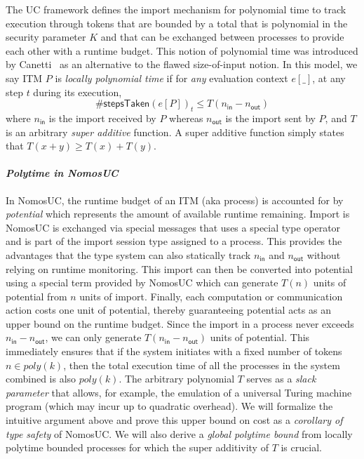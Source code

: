 The UC framework defines the import mechanism for polynomial time to track execution through tokens that
are bounded by a total that is polynomial in the security parameter $K$ and that can be exchanged between processes to provide each other with a runtime budget.
This notion of polynomial time was introduced by Canetti~\cite{canettiUC} as an alternative to the flawed size-of-input notion. 
In this model, we say ITM $P$ is \emph{locally polynomial time} if for \emph{any} evaluation context $e[\_]$, at any step $t$ during its execution,
\[
\#\textsf{stepsTaken}(e[P])_{t} \le T(n_{\textsf{in}} - n_{\textsf{out}})
\]
where $n_{\textsf{in}}$ is the import received by $P$ whereas $n_{\textsf{out}}$ is the import sent by $P$, and $T$ is an arbitrary
\emph{super additive} function.
A super additive function simply states that $T(x+y) \geq T(x) + T(y)$.

\paragraph*{\textbf{\textit{Polytime in NomosUC}}}
In NomosUC, the runtime budget of an ITM (aka process) is accounted for by \emph{potential} which represents the amount
of available runtime remaining.
Import is NomosUC is exchanged via special messages that uses a special type operator and is part of the import session type
assigned to a process.
This provides the advantages that the type system can also statically track $n_\textsf{in}$ and $n_\textsf{out}$
without relying on runtime monitoring.
This import can then be converted into potential using a special term provided by NomosUC which can generate $T(n)$
units of potential from $n$ units of import.
Finally, each computation or communication action costs one unit of potential, thereby guaranteeing 
potential acts as an upper bound on the runtime budget.
Since the import in a process never exceeds $n_{\textsf{in}} - n_{\textsf{out}}$, we can only generate
$T(n_{\textsf{in}} - n_{\textsf{out}})$ units of potential.
This immediately ensures that if the system initiates with a fixed number of tokens $n \in poly(k)$,
then the total execution time of all the processes in the system combined is also $poly(k)$.
The arbitrary polynomial $T$ serves as a \emph{slack parameter} that allows, for example,
the emulation of a universal Turing machine program (which may incur up to quadratic overhead).
We will formalize the intuitive argument above and prove this upper bound on cost as a \emph{corollary
of type safety} of NomosUC.
We will also derive a \emph{global polytime bound} from locally polytime bounded processes for which
the super additivity of $T$ is crucial.

